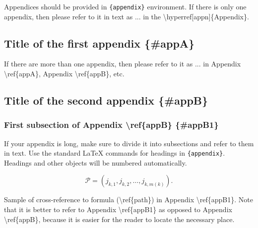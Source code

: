 \documentclass[qe,nameyear,draft]{econsocart}
\theoremstyle{plain}
\theoremstyle{remark}
\begin{document}
\begin{appendix}
Appendices should be provided in \texttt{\{appendix\}} environment. If there is only one appendix,
then please refer to it in text as ... in the {\textbackslash}hyperref[appn]\{Appendix\}.

\subsection{Title of the first appendix \{\#appA\}}

If there are more than one appendix, then please refer to it
as ... in Appendix {\textbackslash}ref\{appA\}, Appendix {\textbackslash}ref\{appB\}, etc.

\subsection{Title of the second appendix \{\#appB\}}

\subsubsection{First subsection of Appendix {\textbackslash}ref\{appB\} \{\#appB1\}}

If your appendix is long, make sure to divide it into subsections and refer to them in text. Use the standard LaTeX commands for headings in \texttt{\{appendix\}}.
Headings and other objects will be numbered automatically.

\begin{equation}
\label{path}
\mathcal{P}=(j_{k,1},j_{k,2},\dots,j_{k,m(k)}).
\end{equation}

Sample of cross-reference to formula ({\textbackslash}ref\{path\}) in Appendix {\textbackslash}ref\{appB1\}.
Note that it is better to refer to Appendix {\textbackslash}ref\{appB1\} as opposed to Appendix {\textbackslash}ref\{appB\}, because it is easier for the reader to locate the necessary place.
\end{appendix}




\end{document}
